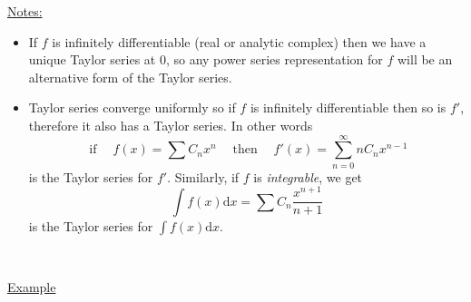 \documentclass{article}
\newcommand{\mathd}{\mathrm{d}}
\newcommand{\tmem}[1]{{\em #1\/}}
\newcommand{\tmop}[1]{\ensuremath{\operatorname{#1}}}
\newcommand{\tmxspace}{\hspace{1em}}
\newenvironment{itemizedot}{\begin{itemize} \renewcommand{\labelitemi}{$\bullet$}\renewcommand{\labelitemii}{$\bullet$}\renewcommand{\labelitemiii}{$\bullet$}\renewcommand{\labelitemiv}{$\bullet$}}{\end{itemize}}
\begin{document}
{\underline{Notes:}}
\begin{itemizedot}
  \item If $f$ is infinitely differentiable (real or analytic complex) then we
  have a unique Taylor series at 0, so any power series representation for $f$
  will be an alternative form of the Taylor series.
  
  \item Taylor series converge uniformly so if $f$ is infinitely
  differentiable then so is $f'$, therefore it also has a Taylor series. In
  other words
  \[ \tmop{if} \tmxspace f (x) = \sum C_n x^n \tmxspace \tmop{then} \tmxspace
     f' (x) = \sum_{n = 0}^{\infty} n C_n x^{n - 1} \]
  is the Taylor series for $f'$. Similarly, if $f$ is {\tmem{integrable}}, we
  get
  \[ \int f (x) \mathd x = \sum C_n  \frac{x^{n + 1}}{n + 1} \]
  is the Taylor series for $\int f (x) \mathd x$.
  
  \ 
\end{itemizedot}
{\underline{Example}}
\end{document}
